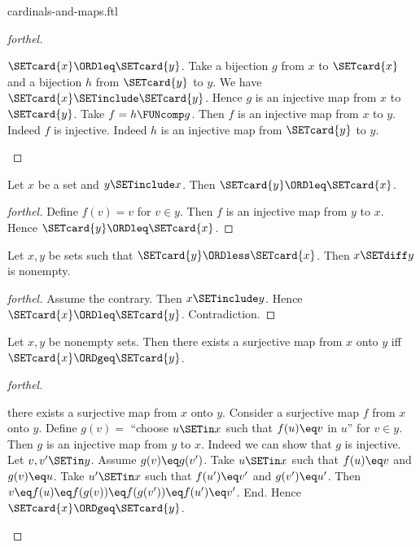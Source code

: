 \documentclass{naproche-library}
\begin{document}
\begin{smodule}[title=Cardinal Numbers and Maps]{cardinals-and-maps.ftl}
\begin{proof}[forthel]
  \begin{case}{$\SETcard{x} \ORDleq \SETcard{y}$.}
    Take a bijection $g$ from $x$ to $\SETcard{x}$ and a bijection $h$ from $\SETcard{y}$ to $y$.
    We have $\SETcard{x} \SETinclude \SETcard{y}$.
    Hence $g$ is an injective map from $x$ to $\SETcard{y}$.
    Take $f = h \FUNcomp g$.
    Then $f$ is an injective map from $x$ to $y$.
    Indeed $f$ is injective.
    Indeed $h$ is an injective map from $\SETcard{y}$ to $y$.
  \end{case}
\end{proof}

\begin{corollary}[forthel,id=SET_THEORY_06_4944303633727488]
  Let $x$ be a set and $y \SETinclude x$.
  Then $\SETcard{y} \ORDleq \SETcard{x}$.
\end{corollary}
\begin{proof}[forthel]
  Define $f(v) = v$ for $v \in y$.
  Then $f$ is an injective map from $y$ to $x$.
  Hence $\SETcard{y} \ORDleq \SETcard{x}$.
\end{proof}

\begin{corollary}[forthel,id=SET_THEORY_06_7746592696172544]
  Let $x, y$ be sets such that $\SETcard{y} \ORDless \SETcard{x}$.
  Then $x \SETdiff y$ is nonempty.
\end{corollary}
\begin{proof}[forthel]
  Assume the contrary.
  Then $x \SETinclude y$.
  Hence $\SETcard{x} \ORDleq \SETcard{y}$.
  Contradiction.
\end{proof}

\begin{proposition}[forthel,id=SET_THEORY_06_192336220913664]
  Let $x, y$ be nonempty sets.
  Then there exists a surjective map from $x$ onto $y$ iff $\SETcard{x} \ORDgeq \SETcard{y}$.
\end{proposition}
\begin{proof}[forthel]
  \begin{case}{there exists a surjective map from $x$ onto $y$.}
    Consider a surjective map $f$ from $x$ onto $y$.
    Define $g(v) =$ ``choose $u \SETin x$ such that $f(u) \eq v$ in $u$'' for $v \in y$.
    Then $g$ is an injective map from $y$ to $x$.
    Indeed we can show that $g$ is injective.
      Let $v, v' \SETin y$.
      Assume $g(v) \eq g(v')$.
      Take $u \SETin x$ such that $f(u) \eq v$ and $g(v) \eq u$.
      Take $u' \SETin x$ such that $f(u') \eq v'$ and $g(v') \eq u'$.
      Then $v
        \eq f(u)
        \eq f(g(v))
        \eq f(g(v'))
        \eq f(u')
        \eq v'$.
    End.
    Hence $\SETcard{x} \ORDgeq \SETcard{y}$.
  \end{case}


\end{proof}
\end{smodule}
\end{document}
